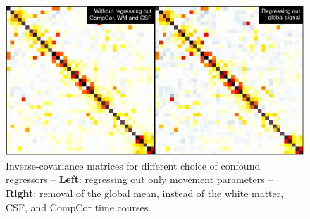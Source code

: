 \documentclass[5p]{elsarticle}
\begin{document}
\begin{figure}
\includegraphics[width=\linewidth]{pg_0004}%

\caption{Inverse-covariance matrices for different choice of
confound regressors --
\label{fig:icov_regressors}
\textbf{Left}: regressing out only movement parameters --
\textbf{Right}: removal of the global mean,
instead of the white matter, CSF, and CompCor time courses. 
}
\end{figure}
\end{document}
